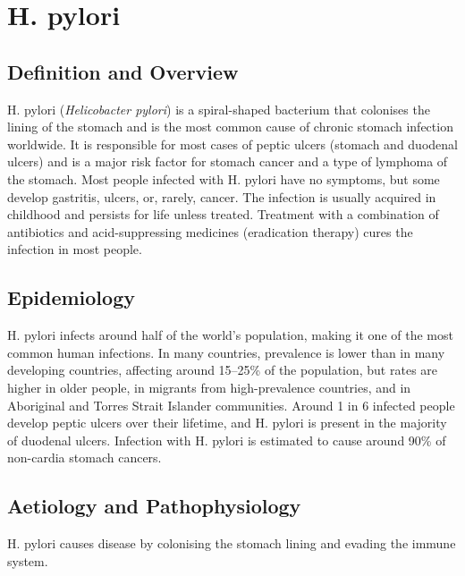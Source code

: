 \chapter{H. pylori}

\section*{Definition and Overview}
H. pylori (\textit{Helicobacter pylori}) is a spiral-shaped bacterium that colonises the lining of the stomach and is the most common cause of chronic stomach infection worldwide. It is responsible for most cases of peptic ulcers (stomach and duodenal ulcers) and is a major risk factor for stomach cancer and a type of lymphoma of the stomach. Most people infected with H. pylori have no symptoms, but some develop gastritis, ulcers, or, rarely, cancer. The infection is usually acquired in childhood and persists for life unless treated. Treatment with a combination of antibiotics and acid-suppressing medicines (eradication therapy) cures the infection in most people.

\section*{Epidemiology}
H. pylori infects around half of the world's population, making it one of the most common human infections. In many countries, prevalence is lower than in many developing countries, affecting around 15--25\% of the population, but rates are higher in older people, in migrants from high-prevalence countries, and in Aboriginal and Torres Strait Islander communities. Around 1 in 6 infected people develop peptic ulcers over their lifetime, and H. pylori is present in the majority of duodenal ulcers. Infection with H. pylori is estimated to cause around 90\% of non-cardia stomach cancers.

\section*{Aetiology and Pathophysiology}
H. pylori causes disease by colonising the stomach lining and evading the immune system.

